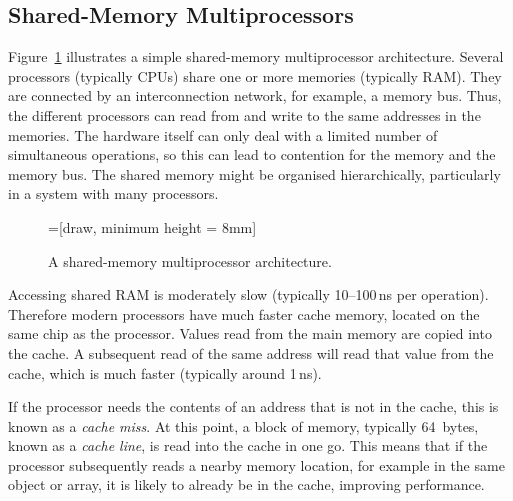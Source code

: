 
\subsection{Shared-Memory Multiprocessors}

Figure~\ref{fig:multi-arch} illustrates a simple shared-memory multiprocessor
architecture.  Several processors
(typically CPUs) share one or more memories (typically RAM).  They are
connected by an interconnection network, for example, a memory bus.  Thus, the
different processors can read from and write to the same addresses in the
memories.  The hardware itself can only deal with a limited number of
simultaneous operations, so this can lead to contention for the memory
and the memory bus.  The shared memory might be organised hierarchically,
particularly in a system with many processors.


\begin{figure}
=[draw, minimum height = 8mm]
\begin{center}
\end{center}
\caption{A shared-memory multiprocessor architecture.}
\label{fig:multi-arch}
\end{figure}

Accessing shared RAM is moderately slow (typically 10--100\,ns per operation).
Therefore modern processors have much faster cache memory,
located on the same chip as the processor.  Values read from the main memory
are copied into the cache.  A subsequent read of the same address will read
that value from the cache, which is much faster (typically around 1\,ns).

If the processor needs the contents of an address that is not in the cache,
this is known as a \emph{cache miss}.  At this point, a block of memory,
typically 64~bytes, known as a \emph{cache line}, is read into the cache in
one go.  This means that if the processor subsequently reads a nearby memory
location, for example in the same object or array, it is likely to already be
in the cache, improving performance.
  
